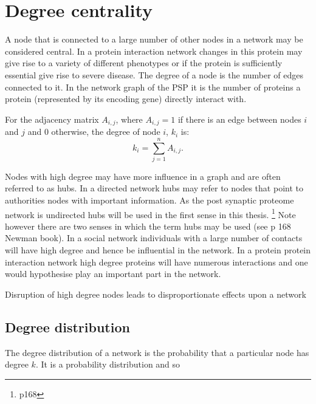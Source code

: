 \section{Degree centrality}
\label{sec:degree centrality}

A node that is connected to a large number of other nodes in a network may be considered central. In a protein interaction network changes in this protein may give rise to a variety of different phenotypes or if the protein is sufficiently essential give rise to severe disease. The degree of a node is the number of edges connected to it. In the network graph of the PSP it is the number of proteins a protein (represented by its encoding gene) directly interact with.


For the adjacency matrix $A_{i,j}$, where $A_{i,j}=1$  if there is an edge between nodes $i$ and $j$ and 0 otherwise, the degree of node $i$, $k_i$ is\cite{boccaletti2006complex}:
\begin{equation}
k_i = \sum_{j=1}^n A_{i,j}.
\label{Equation:Degree_from_adjacency}
\end{equation}

 Nodes with high degree may have more influence in a graph and are often referred to as hubs. In a directed network hubs may refer to nodes that point to authorities nodes with important information. As the post synaptic proteome network is undirected hubs will be used in the first sense in this thesis. \cite{kleinberg1999authoritative} \footnote{\cite{newman2018networks} p168} Note however there are two senses in which the term hubs may be used (see p 168 Newman book\cite{newman2018networks}).  In a social network  individuals with a large number of contacts will have high degree and hence be influential in the network. In a protein protein interaction network high degree proteins will have numerous interactions and one would hypothesise play an important part in the network. 
 
 Disruption of high degree nodes leads to disproportionate effects upon a network \cite{jeong2001lethality} \cite{albert2000error} 

\subsection{Degree distribution}
\label{sec:degree distribution}
The degree distribution of a network is the probability that a particular node has degree $k$. It is a probability distribution and so

